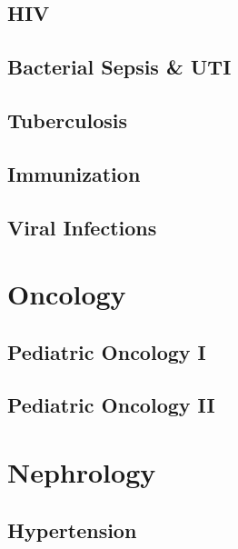 \documentclass[
  letterpaper,
  DIV=11,
  numbers=noendperiod]{scrreprt}
\begin{document}
\hypertarget{hiv}{%
\chapter{HIV}\label{hiv}}

\hypertarget{bacterial-sepsis-uti}{%
\chapter{Bacterial Sepsis \& UTI}\label{bacterial-sepsis-uti}}

\hypertarget{tuberculosis}{%
\chapter{Tuberculosis}\label{tuberculosis}}

\hypertarget{immunization}{%
\chapter{Immunization}\label{immunization}}

\hypertarget{viral-infections}{%
\chapter{Viral Infections}\label{viral-infections}}

\part{{Oncology}}

\hypertarget{pediatric-oncology-i}{%
\chapter{Pediatric Oncology I}\label{pediatric-oncology-i}}

\hypertarget{pediatric-oncology-ii}{%
\chapter{Pediatric Oncology II}\label{pediatric-oncology-ii}}

\part{{Nephrology}}

\hypertarget{hypertension}{%
\chapter{Hypertension}\label{hypertension}}
\end{document}
